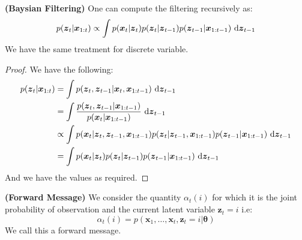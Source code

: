 \begin{lemma}{\textbf{(Baysian Filtering)}}
    One can compute the filtering recursively as:
    \begin{equation*}
        p(\boldsymbol z_t | \boldsymbol x_{1:t}) \propto \int p(\boldsymbol x_t|\boldsymbol z_t)p(\boldsymbol z_t|\boldsymbol z_{t-1})p(\boldsymbol z_{t-1} | \boldsymbol x_{1:t-1})\ \mathrm{d}\boldsymbol z_{t-1}
    \end{equation*}
    We have the same treatment for discrete variable. 
\end{lemma}
\begin{proof}
    We have the following:
    \begin{equation*}
    \begin{aligned}
        p(\boldsymbol z_t | \boldsymbol x_{1:t}) 
        &= \int p(\boldsymbol z_t, \boldsymbol z_{t-1} | \boldsymbol x_t, \boldsymbol x_{1:t-1}) \ \mathrm{d} \boldsymbol z_{t-1} \\
        &= \int \frac{p(\boldsymbol z_t, \boldsymbol z_{t-1} | \boldsymbol x_{1:t-1})}{p(\boldsymbol x_t | \boldsymbol x_{1:t-1})} \ \mathrm{d} \boldsymbol z_{t-1} \\
        &\propto \int p(\boldsymbol x_t|\boldsymbol z_t, \boldsymbol z_{t-1}, \boldsymbol x_{1:t-1}) p(\boldsymbol z_t | \boldsymbol z_{t-1}, \boldsymbol x_{1:t-1}) p(\boldsymbol z_{t-1} | \boldsymbol x_{1:t-1})\ \mathrm{d} \boldsymbol z_{t-1} \\
        &= \int p(\boldsymbol x_t|\boldsymbol z_t) p(\boldsymbol z_t | \boldsymbol z_{t-1}) p(\boldsymbol z_{t-1} | \boldsymbol x_{1:t-1})\ \mathrm{d} \boldsymbol z_{t-1} \\
    \end{aligned}
    \end{equation*}
    And we have the values as required.
\end{proof}

\begin{definition}{\textbf{(Forward Message)}}
    We consider the quantity $\alpha_t(i)$ for which it is the joint probability of observation and the current latent variable $\boldsymbol z_t = i$ i.e:
    \begin{equation*}
        \alpha_t(i) = p(\boldsymbol x_1,\dots,\boldsymbol x_t, \boldsymbol z_t = i | \boldsymbol \theta)
    \end{equation*}
    We call this a forward message. 
\end{definition}

